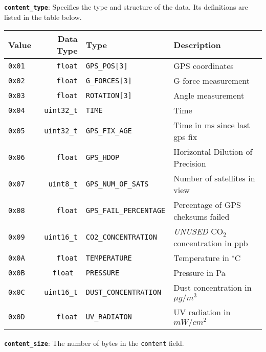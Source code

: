\documentclass[a4paper]{article}
\begin{document}
\textbf{\texttt{content\_type}}: Specifies the type and structure of the data. Its definitions are listed in the table below.
\newpage
\begin{longtable}{@{}lrll@{}}
  \toprule
  Value         & Data Type         & Type                           & Description                      \\
  \midrule
  \texttt{0x01} & \texttt{float}    &\texttt{GPS\_POS[3]}            & GPS coordinates                          \\
  \texttt{0x02} & \texttt{float}    &\texttt{G\_FORCES[3]}           & G-force measurement                      \\
  \texttt{0x03} & \texttt{float}    &\texttt{ROTATION[3]}            & Angle measurement                        \\
  \texttt{0x04} & \texttt{uint32\_t}&\texttt{TIME}                   & Time                                     \\
  \texttt{0x05} & \texttt{uint32\_t}&\texttt{GPS\_FIX\_AGE}          & Time in ms since last gps fix            \\
  \texttt{0x06} & \texttt{float}    &\texttt{GPS\_HDOP}              & Horizontal Dilution of Precision         \\
  \texttt{0x07} & \texttt{uint8\_t} &\texttt{GPS\_NUM\_OF\_SATS}     & Number of satellites in view             \\
  \texttt{0x08} & \texttt{float}    &\texttt{GPS\_FAIL\_PERCENTAGE}  & Percentage of GPS cheksums failed        \\
  \texttt{0x09} & \texttt{uint16\_t}&\texttt{CO2\_CONCENTRATION}     & \emph{UNUSED} CO$_2$ concentration in ppb\\
  \texttt{0x0A} & \texttt{float}    &\texttt{TEMPERATURE}            & Temperature in $^\circ$C                 \\
  \texttt{0x0B} & \texttt{float    }&\texttt{PRESSURE}               & Pressure in Pa                           \\
  \texttt{0x0C} & \texttt{uint16\_t}&\texttt{DUST\_CONCENTRATION}    & Dust concentration in $\mu g/m^3$        \\
  \texttt{0x0D} & \texttt{float}    &\texttt{UV\_RADIATON}           & UV radiation in $mW/cm^2$                \\
  \bottomrule
\end{longtable}

\textbf{\texttt{content\_size}}: The number of bytes in the \texttt{content} field.
\end{document}
